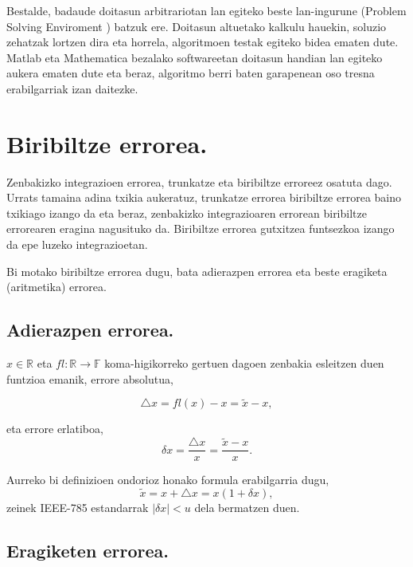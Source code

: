 Bestalde, badaude doitasun arbitrariotan lan egiteko beste lan-ingurune (Problem Solving Enviroment \cite{Higham2015}) batzuk ere. Doitasun altuetako kalkulu hauekin, soluzio zehatzak lortzen dira eta horrela, algoritmoen testak egiteko bidea ematen dute. Matlab eta Mathematica bezalako softwareetan doitasun handian lan egiteko aukera ematen dute eta beraz, algoritmo berri baten garapenean oso tresna erabilgarriak izan daitezke.

 
\section{Biribiltze errorea.}

Zenbakizko integrazioen errorea, trunkatze eta biribiltze erroreez osatuta dago. Urrats tamaina adina txikia aukeratuz, trunkatze errorea biribiltze errorea baino txikiago izango da eta beraz, zenbakizko integrazioaren errorean biribiltze errorearen eragina nagusituko da. Biribiltze errorea gutxitzea funtsezkoa izango da epe luzeko integrazioetan.     

Bi motako biribiltze errorea dugu, bata adierazpen errorea eta beste eragiketa (aritmetika) errorea.  

\subsection*{Adierazpen errorea.} 

$x \in \mathbb{R}$ eta $fl: \mathbb{R} \rightarrow \mathbb{F}$ 
koma-higikorreko gertuen dagoen zenbakia esleitzen duen funtzioa emanik, errore absolutua,

\begin{equation*}
\triangle x= fl(x)-x= \tilde{x}-x,  
\end{equation*}    
 
eta errore erlatiboa, 
\begin{equation*}
\delta x =\frac{\triangle x}{x} = \frac{\tilde{x}-x}{x}. 
\end{equation*}

Aurreko bi definizioen ondorioz honako formula erabilgarria dugu,
\begin{equation*}
\tilde{x}= x+\triangle x = x(1+\delta x),
\end{equation*}
zeinek IEEE-785 estandarrak $|\delta x|<u$ dela bermatzen duen.

\subsection*{Eragiketen errorea.} 
 
